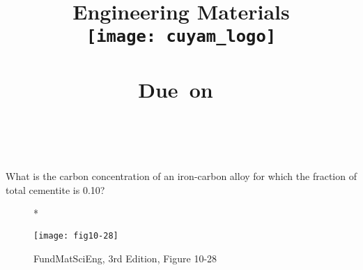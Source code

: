 
\title{
\vspace{2in}
\textmd{\textbf{Engineering Materials}}\\
\texttt{[image: cuyam\_logo]}\\
\textmd{\textbf{\hmwkTitle}}\\
\normalsize\vspace{0.1in}\small{Due\ on\ \hmwkDueDate}\\
\vspace{0.1in}\large{\textit{\hmwkClassInstructor\ \hmwkClassTime}}
\vspace{2in}
}

\author{\textbf{\hmwkAuthorName}}
\date{} %




\maketitle
\newpage


\begin{homeworkProblem}[Problem 10.28] %
  What is the carbon concentration of an iron-carbon alloy for which the fraction of total cementite is 0.10? \\[0.2cm]
  \begin{figure}
    \caption{FundMatSciEng, 3rd Edition, Figure 10-28}*
    \centerline{\texttt{[image: fig10-28]}}
  \end{figure}
\end{homeworkProblem}
\clearpage

